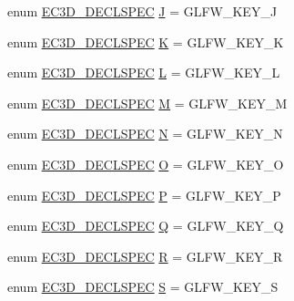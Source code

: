 \begin{DoxyCompactItemize}
\item 
enum \mbox{\hyperlink{_common_8h_aac42573e202ca3dd4d259c81691e2369}{E\+C3\+D\+\_\+\+D\+E\+C\+L\+S\+P\+EC}} \mbox{\hyperlink{classec_1_1_keyboard_a35fe05168d3f2cca6dae07278faa8b75}{J}} = G\+L\+F\+W\+\_\+\+K\+E\+Y\+\_\+J
\item 
enum \mbox{\hyperlink{_common_8h_aac42573e202ca3dd4d259c81691e2369}{E\+C3\+D\+\_\+\+D\+E\+C\+L\+S\+P\+EC}} \mbox{\hyperlink{classec_1_1_keyboard_a43e568b3ad27c96695d50386628353ba}{K}} = G\+L\+F\+W\+\_\+\+K\+E\+Y\+\_\+K
\item 
enum \mbox{\hyperlink{_common_8h_aac42573e202ca3dd4d259c81691e2369}{E\+C3\+D\+\_\+\+D\+E\+C\+L\+S\+P\+EC}} \mbox{\hyperlink{classec_1_1_keyboard_ae3ec80e2b98d6ef1d6fb921ddf3cb52e}{L}} = G\+L\+F\+W\+\_\+\+K\+E\+Y\+\_\+L
\item 
enum \mbox{\hyperlink{_common_8h_aac42573e202ca3dd4d259c81691e2369}{E\+C3\+D\+\_\+\+D\+E\+C\+L\+S\+P\+EC}} \mbox{\hyperlink{classec_1_1_keyboard_ae9723063b666c0dd21e96588ebb734c9}{M}} = G\+L\+F\+W\+\_\+\+K\+E\+Y\+\_\+M
\item 
enum \mbox{\hyperlink{_common_8h_aac42573e202ca3dd4d259c81691e2369}{E\+C3\+D\+\_\+\+D\+E\+C\+L\+S\+P\+EC}} \mbox{\hyperlink{classec_1_1_keyboard_a4dcb87a802eb8775401ae36ac5bd4358}{N}} = G\+L\+F\+W\+\_\+\+K\+E\+Y\+\_\+N
\item 
enum \mbox{\hyperlink{_common_8h_aac42573e202ca3dd4d259c81691e2369}{E\+C3\+D\+\_\+\+D\+E\+C\+L\+S\+P\+EC}} \mbox{\hyperlink{classec_1_1_keyboard_acc3419f140a0bb0e253c84315d7277c7}{O}} = G\+L\+F\+W\+\_\+\+K\+E\+Y\+\_\+O
\item 
enum \mbox{\hyperlink{_common_8h_aac42573e202ca3dd4d259c81691e2369}{E\+C3\+D\+\_\+\+D\+E\+C\+L\+S\+P\+EC}} \mbox{\hyperlink{classec_1_1_keyboard_ab3ab1aa54525f4e0488a0b57a68b8757}{P}} = G\+L\+F\+W\+\_\+\+K\+E\+Y\+\_\+P
\item 
enum \mbox{\hyperlink{_common_8h_aac42573e202ca3dd4d259c81691e2369}{E\+C3\+D\+\_\+\+D\+E\+C\+L\+S\+P\+EC}} \mbox{\hyperlink{classec_1_1_keyboard_a7d2ade0eca9959dcd82b4c4ae9c3a27b}{Q}} = G\+L\+F\+W\+\_\+\+K\+E\+Y\+\_\+Q
\item 
enum \mbox{\hyperlink{_common_8h_aac42573e202ca3dd4d259c81691e2369}{E\+C3\+D\+\_\+\+D\+E\+C\+L\+S\+P\+EC}} \mbox{\hyperlink{classec_1_1_keyboard_a3f2649d7249962a4f485557e405d4754}{R}} = G\+L\+F\+W\+\_\+\+K\+E\+Y\+\_\+R
\item 
enum \mbox{\hyperlink{_common_8h_aac42573e202ca3dd4d259c81691e2369}{E\+C3\+D\+\_\+\+D\+E\+C\+L\+S\+P\+EC}} \mbox{\hyperlink{classec_1_1_keyboard_ab11aae5fb83407687e9f8acdfa163910}{S}} = G\+L\+F\+W\+\_\+\+K\+E\+Y\+\_\+S

\end{DoxyCompactItemize}

